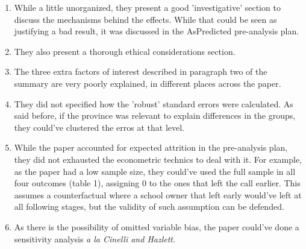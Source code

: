 \documentclass[12pt]{article}
\begin{document}
\begin{enumerate}
    \item While a little unorganized, they present a good 'investigative' section to discuss the mechanisms behind the effects. While that could be seen as justifying a bad result, it was discussed in the AsPredicted pre-analysis plan.
    \item They also present a thorough ethical considerations section.
    \item The three extra factors of interest described in paragraph two of the summary are very poorly explained, in different places across the paper.
    \item They did not specified how the 'robust' standard errors were calculated. As said before, if the province was relevant to explain differences in the groups, they could've clustered the erros at that level.
    \item While the paper accounted for expected attrition in the pre-analysis plan, they did not exhausted the econometric technics to deal with it. For example, as the paper had a low sample size, they could've used the full sample in all four outcomes (table 1), assigning 0 to the ones that left the call earlier. This assumes a counterfactual where a school owner that left early would've left at all following stages, but the validity of such assumption can be defended. 
    \item As there is the possibility of omitted variable bias, the paper could've done a sensitivity analysis \textit{a la Cinelli and Hazlett}.
\end{enumerate}
\end{document}
